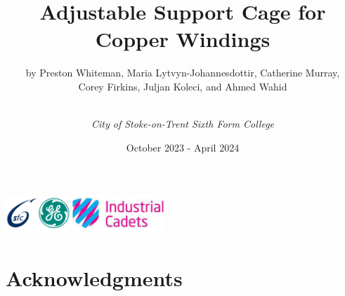 \documentclass[a4paper,10pt]{article}
\title{\textbf{Adjustable Support Cage for Copper Windings}}
\author{by Preston Whiteman, Maria Lytvyn-Johannesdottir, Catherine Murray, \\ Corey Firkins, Juljan Koleci, and Ahmed Wahid\and \\ \textit{City of Stoke-on-Trent Sixth Form College}}
\date{October 2023 - April 2024}
\begin{document}

\maketitle
\begin{center}
    \includegraphics[width = 6cm, height = 1.5cm]{logos.png}
\end{center}
\pagebreak



\tableofcontents
\pagebreak



\section{Acknowledgments}
\end{document}
